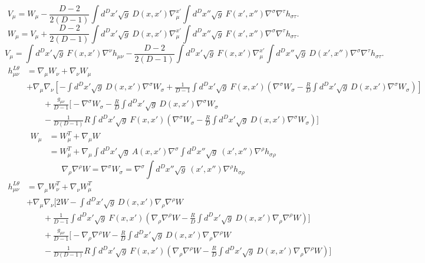 \documentclass[10pt,letterpaper]{article}
\begin{document}
\begin{equation}
V_\mu =  W_\mu- \frac{D-2}{2(D-1)}  \int d^Dx' \sqrt{g}\ D(x,x') \nabla_\mu^{x'}  \int d^Dx'' \sqrt{g}\ F(x',x'')\nabla^\sigma \nabla^\tau h_{\sigma\tau}.
\end{equation}
\begin{equation}
W_\mu =  V_\mu+ \frac{D-2}{2(D-1)}  \int d^Dx' \sqrt{g}\ D(x,x') \nabla_\mu^{x'}  \int d^Dx'' \sqrt{g}\ F(x',x'')\nabla^\sigma \nabla^\tau h_{\sigma\tau}.
\end{equation}
\begin{equation}
V_\mu =   \int d^Dx' \sqrt{g}\ F(x,x') \nabla^\nu h_{\mu\nu}- \frac{D-2}{2(D-1)}  \int d^Dx' \sqrt{g}\ F(x,x') \nabla_\mu^{x'}  \int d^Dx'' \sqrt{g}\ D(x',x'')\nabla^\sigma \nabla^\tau h_{\sigma\tau}.
\end{equation}
\newpage
\begin{align}
h_{\mu\nu}^{L\theta} &= \nabla_\mu W_\nu + \nabla_\nu W_\mu 
\nonumber\\
\quad &+ \nabla_\mu\nabla_\nu \left[ - \int d^Dx' \sqrt{g}\ D(x,x')\nabla^\sigma W_\sigma + \frac{1}{D-1} \int d^Dx' \sqrt{g}\ F(x,x') \left( \nabla^\sigma W_\sigma-\frac{R}{D}\int d^Dx' \sqrt{g}\ D(x,x')\nabla^\sigma W_\sigma\right)\right]
\nonumber\\
&\qquad + \frac{g_{\mu\nu}}{D-1}\bigg[ - \nabla^\sigma W_\sigma - \frac{R}{D} \int d^Dx' \sqrt{g}\ D(x,x')\nabla^\sigma W_\sigma 
\nonumber \\
&\qquad
- \frac{1}{D(D-1)}R \int d^Dx' \sqrt{g}\ F(x,x') \left( \nabla^\sigma W_\sigma-\frac{R}{D}\int d^Dx' \sqrt{g}\ D(x,x')\nabla^\sigma W_\sigma\right)\bigg]
\nonumber
\end{align}
\begin{align}
W_\mu &= W_\mu^T + \nabla_\mu W\\
&=W_\mu^T + \nabla_\mu \int d^Dx' \sqrt{g}\ A(x,x')\nabla^\sigma \int d^Dx'' \sqrt{g}\ (x',x'') \nabla^\rho h_{\sigma\rho}
\end{align}
\begin{equation}
\nabla_\rho \nabla^\rho W = \nabla^\sigma W_\sigma =\nabla^\sigma \int d^Dx'' \sqrt{g}\ (x',x'') \nabla^\rho h_{\sigma\rho}
\end{equation}
\begin{align}
h_{\mu\nu}^{L\theta} &= \nabla_\mu W_\nu^T + \nabla_\nu W_\mu^T  
\nonumber\\
\quad &+ \nabla_\mu\nabla_\nu \bigg[ 2W- \int d^Dx' \sqrt{g}\ D(x,x')\nabla_\rho \nabla^\rho W
\nonumber\\
&\qquad  + \frac{1}{D-1} \int d^Dx' \sqrt{g}\ F(x,x') \left( \nabla_\rho \nabla^\rho W-\frac{R}{D}\int d^Dx' \sqrt{g}\ D(x,x')\nabla_\rho \nabla^\rho W\right)\bigg]
\nonumber\\
&\qquad + \frac{g_{\mu\nu}}{D-1}\bigg[ -\nabla_\rho \nabla^\rho W - \frac{R}{D} \int d^Dx' \sqrt{g}\ D(x,x')\nabla_\rho \nabla^\rho W 
\nonumber \\
&\qquad
- \frac{1}{D(D-1)}R \int d^Dx' \sqrt{g}\ F(x,x') \left(\nabla_\rho \nabla^\rho W-\frac{R}{D}\int d^Dx' \sqrt{g}\ D(x,x')\nabla_\rho \nabla^\rho W\right)\bigg]
\nonumber
\end{align}
\end{document}
